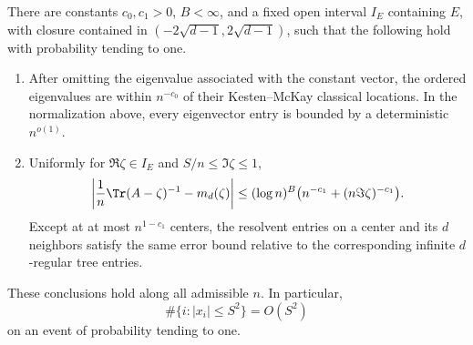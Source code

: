 \begin{proposition}\label{prop:spectral-input}
There are constants \(c_0,c_1>0\), \(B<\infty\), and a fixed open interval
\(I_E\) containing \(E\), with closure contained in
\((-2\sqrt{d-1},2\sqrt{d-1})\), such that the following hold with probability
tending to one.

\begin{enumerate}
\item After omitting the eigenvalue associated with the constant vector,
the ordered eigenvalues are within \(n^{-c_0}\) of their
Kesten--McKay classical locations. In the normalization above, every
eigenvector entry is bounded by a deterministic \(n^{o(1)}\).
\item Uniformly for \(\Re\zeta\in I_E\) and \(S/n\le\Im\zeta\le1\),
\[
 \left|\frac1n\Tr(A-\zeta)^{-1}-m_d(\zeta)\right|
 \le(\log n)^B\bigl(n^{-c_1}+(n\Im\zeta)^{-c_1}\bigr).
\]
Except at at most \(n^{1-c_1}\) centers, the resolvent entries on a
center and its \(d\) neighbors satisfy the same error bound relative
to the corresponding infinite \(d\)-regular tree entries.
\end{enumerate}
These conclusions hold along all admissible \(n\). In particular,
\[
 \#\{i:|x_i|\le S^2\}=O(S^2)
\]
on an event of probability tending to one.
\end{proposition}

